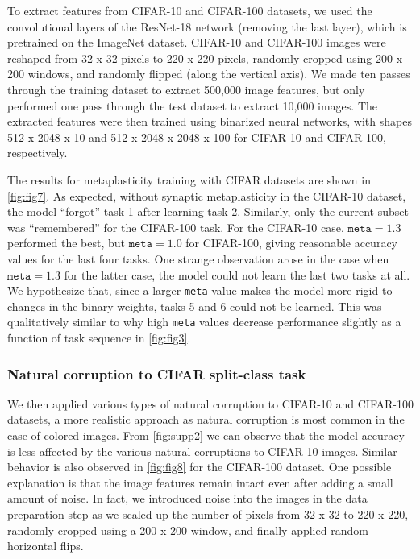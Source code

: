 \documentclass[manuscript,screen,review=false, nonacm]{acmart}
\begin{document}
To extract features from CIFAR-10 and CIFAR-100 datasets, we used the convolutional layers of the ResNet-18 network (removing the last layer), which is pretrained on the ImageNet dataset. CIFAR-10 and CIFAR-100 images were reshaped from 32 x 32 pixels to 220 x 220 pixels, randomly cropped using 200 x 200 windows, and randomly flipped (along the vertical axis). We made ten passes through the training dataset to extract 500,000 image features, but only performed one pass through the test dataset to extract 10,000 images. The extracted features were then trained using binarized neural networks, with shapes 512 x 2048 x 10 and 512 x 2048 x 2048 x 100 for CIFAR-10 and CIFAR-100, respectively. 

The results for metaplasticity training with CIFAR datasets are shown in \autoref{fig:fig7}. As expected, without synaptic metaplasticity in the CIFAR-10 dataset, the model ``forgot'' task 1 after learning task 2. Similarly, only the current subset was ``remembered'' for the CIFAR-100 task. For the CIFAR-10 case, $\texttt{meta} = 1.3$ performed the best, but $\texttt{meta} = 1.0$ for CIFAR-100, giving reasonable accuracy values for the last four tasks. One strange observation arose in the case when $\texttt{meta} = 1.3$ for the latter case, the model could not learn the last two tasks at all. We hypothesize that, since a larger \texttt{meta} value makes the model more rigid to changes in the binary weights, tasks 5 and 6 could not be learned. This was qualitatively similar to why high \texttt{meta} values decrease performance slightly as a function of task sequence in \autoref{fig:fig3}.

\subsubsection{Natural corruption to CIFAR split-class task}

We then applied various types of natural corruption to CIFAR-10 and CIFAR-100 datasets, a more realistic approach as natural corruption is most common in the case of colored images. From \autoref{fig:supp2} we can observe that the model accuracy is less affected by the various natural corruptions to CIFAR-10 images. Similar behavior is also observed in \autoref{fig:fig8} for the CIFAR-100 dataset. One possible explanation is that the image features remain intact even after adding a small amount of noise. In fact, we introduced noise into the images in the data preparation step as we scaled up the number of pixels from 32 x 32 to 220 x 220, randomly cropped using a 200 x 200 window, and finally applied random horizontal flips. 
\end{document}
